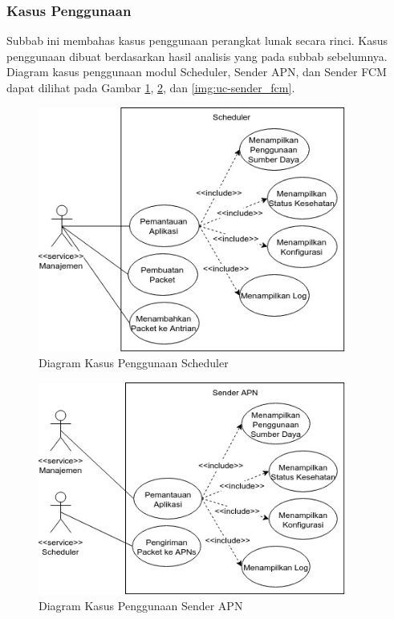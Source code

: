 \subsubsection{Kasus Penggunaan}
\par Subbab ini membahas kasus penggunaan perangkat lunak secara rinci. Kasus penggunaan dibuat berdasarkan hasil analisis yang pada subbab sebelumnya. Diagram kasus penggunaan modul Scheduler, Sender APN, dan Sender FCM dapat dilihat pada Gambar \ref{img:uc-scheduler}, \ref{img:uc-sender_apn}, dan \ref{img:uc-sender_fcm}.
\clearpage
\begin{figure}[H]
    \centering\includegraphics[width=0.9\textwidth]{bab3/img/usecase-scheduler.jpg}
    \caption{Diagram Kasus Penggunaan Scheduler} \label{img:uc-scheduler}
\end{figure}
\begin{figure}[H]
	\centering\includegraphics[width=0.9\textwidth]{bab3/img/usecase-sender_apn.jpg}
	\caption{Diagram Kasus Penggunaan Sender APN} \label{img:uc-sender_apn}
\end{figure}
